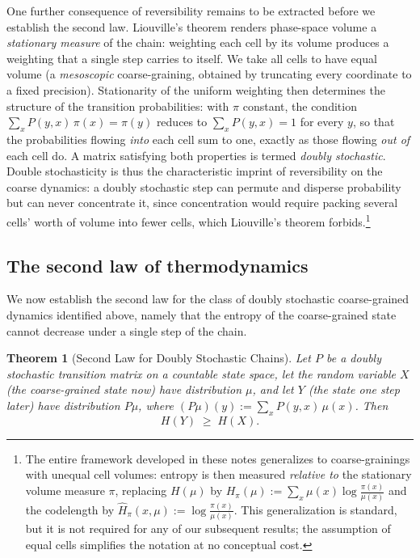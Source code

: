 \documentclass[10pt]{article}
\newtheorem{theorem}{Theorem}[section]
\theoremstyle{definition}
\theoremstyle{remark}
\begin{document}
One further consequence of reversibility remains to be extracted before we establish the second law. Liouville's theorem renders phase-space volume a \emph{stationary measure} of the chain: weighting each cell by its volume produces a weighting that a single step carries to itself. We take all cells to have equal volume (a \emph{mesoscopic} coarse-graining, obtained by truncating every coordinate to a fixed precision). Stationarity of the uniform weighting then determines the structure of the transition probabilities: with $\pi$ constant, the condition $\sum_x P(y,x)\,\pi(x) = \pi(y)$ reduces to $\sum_x P(y, x) = 1$ for every $y$, so that the probabilities flowing \emph{into} each cell sum to one, exactly as those flowing \emph{out of} each cell do. A matrix satisfying both properties is termed \emph{doubly stochastic}. Double stochasticity is thus the characteristic imprint of reversibility on the coarse dynamics: a doubly stochastic step can permute and disperse probability but can never concentrate it, since concentration would require packing several cells' worth of volume into fewer cells, which Liouville's theorem forbids.\footnote{The entire framework developed in these notes generalizes to coarse-grainings with unequal cell volumes: entropy is then measured \emph{relative to} the stationary volume measure $\pi$, replacing $H(\mu)$ by $H_\pi(\mu) := \sum_x \mu(x) \log \frac{\pi(x)}{\mu(x)}$ and the codelength by $\hat H_\pi(x,\mu) := \log\frac{\pi(x)}{\mu(x)}$. This generalization is standard, but it is not required for any of our subsequent results; the assumption of equal cells simplifies the notation at no conceptual cost.}

\subsection{The second law of thermodynamics}
\label{sec:secondlawproof}

We now establish the second law for the class of doubly stochastic coarse-grained dynamics identified above, namely that the entropy of the coarse-grained state cannot decrease under a single step of the chain.

\begin{theorem}[Second Law for Doubly Stochastic Chains]
\label{thm:secondlaw}
Let $P$ be a doubly stochastic transition matrix on a countable state space, let the random variable $X$ (the coarse-grained state now) have distribution $\mu$, and let $Y$ (the state one step later) have distribution $P\mu$, where $(P\mu)(y) := \sum_x P(y,x)\,\mu(x)$. Then
\[
H(Y) \;\ge\; H(X).
\]
\end{theorem}
\end{document}

